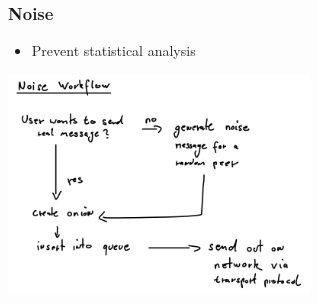 \documentclass{beamer}
\begin{document}
\frame
{
  \frametitle{Noise}
  \begin{itemize}
      \item Prevent statistical analysis
   \end{itemize}
  \begin{center}
   \includegraphics[width=8cm]{../noiseworkflow.png}
  \end{center}
}

\end{document}
